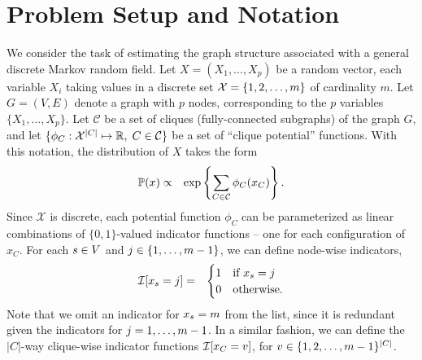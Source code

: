 \def\CliqueSet{\mathcal{C}}
\def\clique{C}

\section{Problem Setup and Notation}

 We consider the task of estimating the graph structure associated with a general discrete Markov random field. Let $X = (X_1,\hdots,X_p)$ be a random vector, each variable $X_i$ taking values in a discrete set $\mathcal{X}= \{1,2, \ldots, m\}$ of cardinality $m$. Let $G = (V,E)$ denote a graph with $p$ nodes,  corresponding to the $p$ variables $\{X_1,\hdots,X_p\}$. Let $\CliqueSet$ be a set of cliques (fully-connected subgraphs) of the graph $G$, and let $\{ \phi_{\clique} : \mathcal{X}^{|\clique|} \mapsto \real, \; \clique \in \CliqueSet \}$ be a set of ``clique potential'' functions. With this notation, the distribution of $X$ takes the form
\begin{eqnarray}
\label{EqnGenMRFPot}
\mprob(x) & \propto & \exp \left \{\sum_{\clique \in \CliqueSet} \phi_\clique(x_\clique) \right \}.
\end{eqnarray}
\noindent Since $\mathcal{X}$ is discrete, each potential function $\phi_{\clique}$
can be parameterized as linear combinations of $\{0,1\}$-valued indicator functions -- one for each configuration of $x_\clique$.  
For each $s \in V$ and $j \in \{1, \ldots, m-1\}$, we can define node-wise indicators, 
\begin{eqnarray*}
\mathcal{I}[x_{s} = j] & = & \begin{cases} 1 & \mbox{if $x_s =j$} \\ 
											0 & \mbox{otherwise.}
                    \end{cases}
\end{eqnarray*}
Note that we omit an indicator for $x_s = m$ from the list, since
it is redundant given the indicators for $j = 1, \ldots, m-1$.
In a similar fashion, we can define the $|\clique|$-way clique-wise indicator functions 
$\I[x_\clique = v]$, for $v \in \{1,2,\ldots, \statenum - 1\}^{|\clique|}$.

